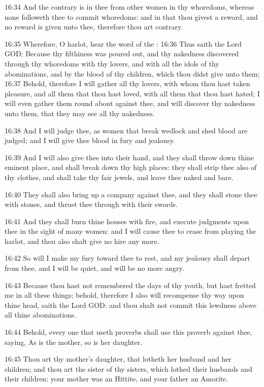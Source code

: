 16:34 And the contrary is in thee from other women in thy whoredoms,
whereas none followeth thee to commit whoredoms: and in that thou
givest a reward, and no reward is given unto thee, therefore thou art
contrary.

16:35 Wherefore, O harlot, hear the word of the \LORD: 16:36 Thus saith
the Lord GOD; Because thy filthiness was poured out, and thy nakedness
discovered through thy whoredoms with thy lovers, and with all the
idols of thy abominations, and by the blood of thy children, which
thou didst give unto them; 16:37 Behold, therefore I will gather all
thy lovers, with whom thou hast taken pleasure, and all them that thou
hast loved, with all them that thou hast hated; I will even gather
them round about against thee, and will discover thy nakedness unto
them, that they may see all thy nakedness.

16:38 And I will judge thee, as women that break wedlock and shed
blood are judged; and I will give thee blood in fury and jealousy.

16:39 And I will also give thee into their hand, and they shall throw
down thine eminent place, and shall break down thy high places: they
shall strip thee also of thy clothes, and shall take thy fair jewels,
and leave thee naked and bare.

16:40 They shall also bring up a company against thee, and they shall
stone thee with stones, and thrust thee through with their swords.

16:41 And they shall burn thine houses with fire, and execute
judgments upon thee in the sight of many women: and I will cause thee
to cease from playing the harlot, and thou also shalt give no hire any
more.

16:42 So will I make my fury toward thee to rest, and my jealousy
shall depart from thee, and I will be quiet, and will be no more
angry.

16:43 Because thou hast not remembered the days of thy youth, but hast
fretted me in all these things; behold, therefore I also will
recompense thy way upon thine head, saith the Lord GOD: and thou shalt
not commit this lewdness above all thine abominations.

16:44 Behold, every one that useth proverbs shall use this proverb
against thee, saying, As is the mother, so is her daughter.

16:45 Thou art thy mother's daughter, that lotheth her husband and her
children; and thou art the sister of thy sisters, which lothed their
husbands and their children: your mother was an Hittite, and your
father an Amorite.


